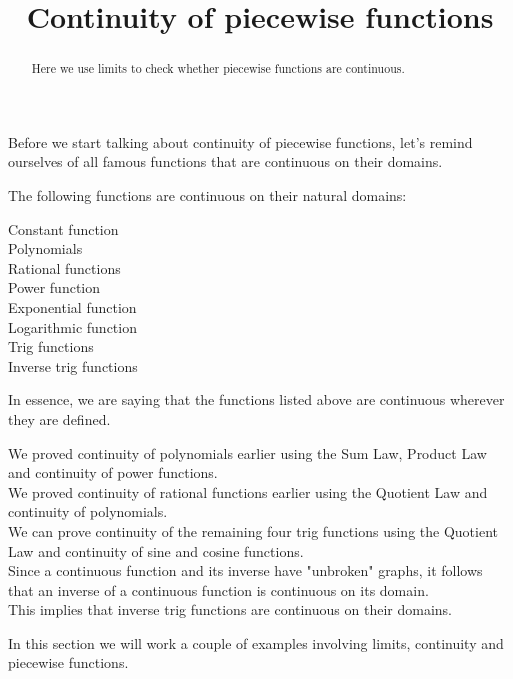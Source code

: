 \documentclass{ximera}
\title[Dig-In:]{Continuity of piecewise functions}
\begin{document}
\begin{abstract}
Here we use limits to check whether piecewise functions are continuous.
\end{abstract}
\maketitle
Before we start talking about continuity of piecewise functions, let's remind ourselves of all famous functions that are continuous on their domains.
\begin{theorem}\label{theorem:continuity}
The following functions are continuous on their natural domains:
\begin{description}
\item[Constant function]
\item[Polynomials]
\item[Rational functions]
\item[Power function]
\item[Exponential function] 
\item[Logarithmic function] 
\item[Trig functions]  
\item[Inverse trig functions]     
\end{description}
In essence, we are saying that the functions listed above are
continuous wherever they are defined.

We  proved continuity of polynomials earlier using the Sum Law, Product Law and continuity of power functions.\\
We  proved continuity of rational functions earlier using the Quotient Law and  continuity of polynomials.\\
We can  prove continuity of the remaining four trig functions using the Quotient Law and continuity of sine and cosine functions.\\

Since a continuous function and its inverse have "unbroken" graphs, it follows that an inverse of a continuous function is continuous on its domain.\\
This implies that inverse trig functions are continuous on their domains. \\

\end{theorem}
In this section we will work a couple of examples involving limits,
continuity and piecewise functions.
\end{document}
